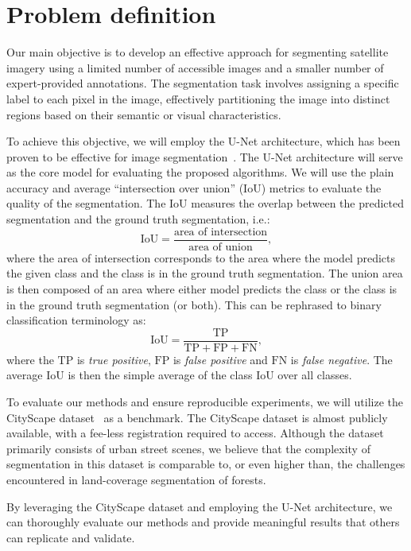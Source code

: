 \section{Problem definition}
Our main objective is to develop an effective approach for segmenting satellite imagery using a limited number of 
accessible images and a smaller number of expert-provided annotations. The segmentation task involves assigning a 
specific label to each pixel in the image, effectively partitioning the image into distinct regions based on their 
semantic or visual characteristics.

To achieve this objective, we will employ the U-Net architecture, which has been proven to be effective for image 
segmentation~\cite{unet-2015}. The U-Net architecture will serve as the core model for evaluating the proposed algorithms.
We will use the plain accuracy and average ``intersection over union'' (IoU) metrics to evaluate the 
quality of the segmentation. The IoU measures the overlap between the predicted segmentation and the ground truth 
segmentation, i.e.:
$$
\mathrm{IoU} = \frac{\text{area of intersection}}{\text{area of union}},
$$
where the area of intersection corresponds to the area where the model predicts the given class and the class is in the ground truth segmentation.
The union area is then composed of an area where either model predicts the class or the class is in the ground truth segmentation (or both).
This can be rephrased to binary classification terminology as: 
$$
\mathrm{IoU} = \frac{\mathrm{TP}}{\mathrm{TP}+\mathrm{FP}+\mathrm{FN}},
$$
where the $\mathrm{TP}$ is \textit{true positive}, $\mathrm{FP}$ is \textit{false positive} and $\mathrm{FN}$ is \textit{false negative}. 
The average IoU is then the simple average of the class IoU over all classes. 

To evaluate our methods and ensure reproducible experiments, we will utilize the CityScape dataset~\cite{cityscapes-2016} as a benchmark. The CityScape dataset is almost publicly available, with a fee-less 
registration required to access. Although the dataset primarily consists of urban street scenes, we believe that the complexity of segmentation in this dataset is comparable to, or even higher than, the 
challenges encountered in land-coverage segmentation of forests.

By leveraging the CityScape dataset and employing the U-Net architecture, we can thoroughly evaluate our methods and 
provide meaningful results that others can replicate and validate.

